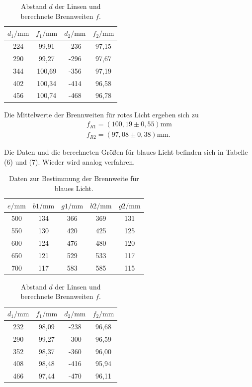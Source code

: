 \begin{table}[H]
\centering
\caption{Abstand $d$ der Linsen und berechnete Brennweiten $f$.}
\label{tab:einzel1}
\begin{tabular}{c c c c}
\toprule
$d_1/\si{\milli\meter}$ & $f_1/\si{\milli\meter}$ & $d_2/\si{\milli\meter}$ & $f_2/\si{\milli\meter}$ \\
\midrule
224 & 99,91 & -236 & 97,15\\
290 & 99,27 & -296 & 97,67\\
344 & 100,69 & -356 & 97,19\\
402 & 100,34 & -414 & 96,58\\
456 & 100,74 & -468 & 96,78\\
\bottomrule
\end{tabular}
\end{table}

Die Mittelwerte der Brennweiten für rotes Licht ergeben sich zu
\begin{align*}
f_{R1} = (100,19 \pm 0,55) \si{\milli\meter} \\
f_{R2} = (97,08 \pm 0,38) \si{\milli\meter} .
\end{align*}

Die Daten und die berechneten Größen für blaues Licht befinden sich in Tabelle (6) und (7). Wieder wird analog verfahren.


\begin{table}[H]
\centering
\caption{Daten zur Bestimmung der Brennweite für blaues Licht.}
\label{tab:einzel1}
\begin{tabular}{c c c c c}
\toprule
$e/\si{\milli\meter}$ &$b1/\si{\milli\meter}$ & $g1/\si{\milli\meter}$ & $b2/\si{\milli\meter}$ & $g2/\si{\milli\meter}$ \\
\midrule
500 &134 & 366 & 369 & 131\\
550 &130 & 420 & 425 & 125\\
600 &124 & 476 & 480 & 120\\
650 &121 & 529 & 533 & 117\\
700 &117 & 583 & 585 & 115\\
\bottomrule
\end{tabular}
\end{table}

\begin{table}[H]
\centering
\caption{Abstand $d$ der Linsen und berechnete Brennweiten $f$.}
\label{tab:einzel1}
\begin{tabular}{c c c c}
\toprule
$d_1/\si{\milli\meter}$ & $f_1/\si{\milli\meter}$ & $d_2/\si{\milli\meter}$ & $f_2/\si{\milli\meter}$ \\
\midrule
232 & 98,09 & -238 & 96,68\\
290 & 99,27 & -300 & 96,59\\
352 & 98,37 & -360 & 96,00\\
408 & 98,48 & -416 & 95,94\\
466 & 97,44 & -470 & 96,11\\
\bottomrule
\end{tabular}
\end{table}

